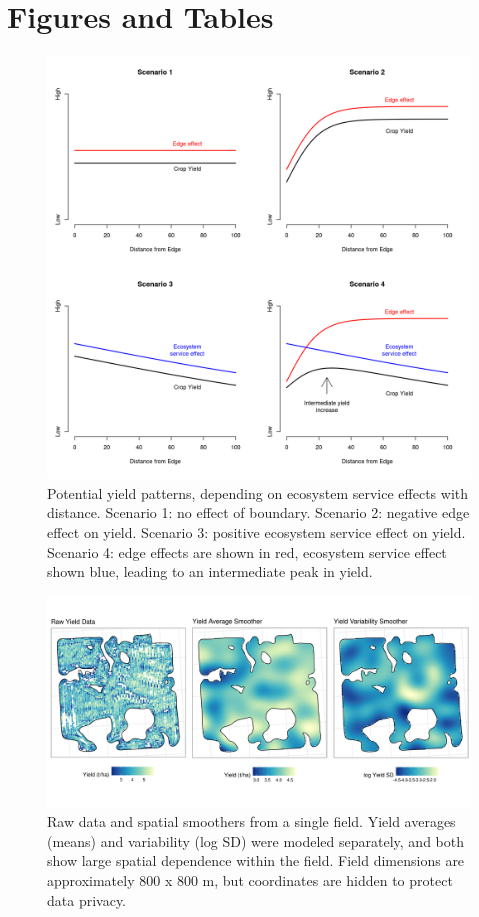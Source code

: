 \documentclass[]{elsarticle} %
\begin{document}
\hypertarget{figures}{%
\section*{Figures and Tables}\label{figures}}

\begin{figure}
\includegraphics[width=1\linewidth]{hypotheses} \caption{Potential yield patterns, depending on ecosystem service effects with distance. Scenario 1: no effect of boundary. Scenario 2: negative edge effect on yield. Scenario 3: positive ecosystem service effect on yield. Scenario 4: edge effects are shown in red, ecosystem service effect shown blue, leading to an intermediate peak in yield.}
\end{figure}

\newpage

\begin{figure}
\includegraphics[width=1\linewidth]{spatialSmooths} \caption{Raw data and spatial smoothers from a single field. Yield averages (means) and variability (log SD) were modeled separately, and both show large spatial dependence within the field. Field dimensions are approximately 800 x 800 m, but coordinates are hidden to protect data privacy.}
\end{figure}
\end{document}
